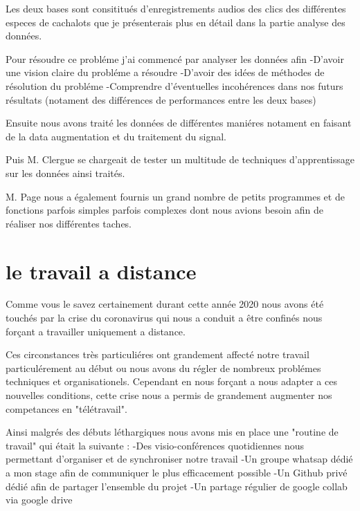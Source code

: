 Les deux bases sont consititués d'enregistrements audios des clics des différentes especes de cachalots que je présenterais plus en détail dans la partie analyse des données.

Pour résoudre ce probléme j'ai commencé par analyser les données afin
-D'avoir une vision claire du probléme a résoudre
-D'avoir des idées de méthodes de résolution du probléme
-Comprendre d'éventuelles incohérences dans nos futurs résultats (notament des différences de performances entre les deux bases)


Ensuite nous avons traité les données de différentes maniéres notament en faisant de la data augmentation et du traitement du signal.

Puis M. Clergue se chargeait de tester un multitude de techniques d'apprentissage sur les données ainsi traités.

M. Page nous a également fournis un grand nombre de petits programmes et de fonctions parfois simples parfois complexes dont nous avions besoin afin de réaliser nos différentes taches.

%

\section{le travail a distance}

\label{letravailadistance}

Comme vous le savez certainement durant cette année 2020 nous avons été touchés par la crise du coronavirus qui nous a conduit a être confinés nous forçant a travailler uniquement a distance.

Ces circonstances très particuliéres ont grandement affecté notre travail particulérement au début ou nous avons du régler de nombreux problémes techniques et organisationels. Cependant en nous forçant a nous adapter a ces nouvelles conditions, cette crise nous a permis de grandement augmenter nos competances en "télétravail".

Ainsi malgrés des débuts léthargiques nous avons mis en place une "routine de travail" qui était la suivante :
-Des visio-conférences quotidiennes nous permettant d'organiser et de synchroniser notre travail
-Un groupe whatsap dédié a mon stage afin de communiquer le plus efficacement possible
-Un Github privé dédié afin de partager l'ensemble du projet
-Un partage régulier de google collab via google drive

%

